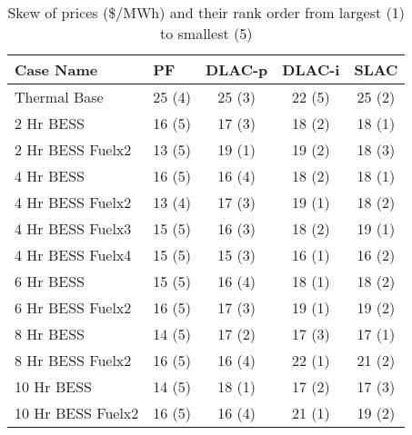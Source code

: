\begin{table}[htp]
\centering
\caption{Skew of prices (\$/MWh) and their rank order from largest (1) to smallest (5)}
\begin{tabular}{lcccc}
\hline
\textbf{Case Name} & \multicolumn{1}{l}{\textbf{PF}} 
& \multicolumn{1}{l}{\textbf{DLAC-p}} 
& \multicolumn{1}{l}{\textbf{DLAC-i}} 
& \multicolumn{1}{l}{\textbf{SLAC}} 
\\
\hline
Thermal Base & 25 (4) & 25 (3) & 22 (5) & 25 (2) \\
2 Hr BESS & 16 (5) & 17 (3) & 18 (2) & 18 (1) \\
2 Hr BESS Fuelx2 & 13 (5) & 19 (1) & 19 (2) & 18 (3) \\
4 Hr BESS & 16 (5) & 16 (4) & 18 (2) & 18 (1) \\
4 Hr BESS Fuelx2 & 13 (4) & 17 (3) & 19 (1) & 18 (2) \\
4 Hr BESS Fuelx3 & 15 (5) & 16 (3) & 18 (2) & 19 (1) \\
4 Hr BESS Fuelx4 & 15 (5) & 15 (3) & 16 (1) & 16 (2) \\
6 Hr BESS & 15 (5) & 16 (4) & 18 (1) & 18 (2) \\
6 Hr BESS Fuelx2 & 16 (5) & 17 (3) & 19 (1) & 19 (2) \\
8 Hr BESS & 14 (5) & 17 (2) & 17 (3) & 17 (1) \\
8 Hr BESS Fuelx2 & 16 (5) & 16 (4) & 22 (1) & 21 (2) \\
10 Hr BESS & 14 (5) & 18 (1) & 17 (2) & 17 (3) \\
10 Hr BESS Fuelx2 & 16 (5) & 16 (4) & 21 (1) & 19 (2) \\
\hline
\end{tabular}
\label{tab:std_with_ranks}
\end{table}
